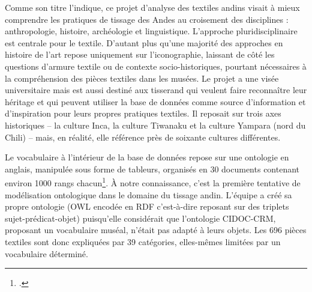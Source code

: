Comme son titre l'indique, ce projet d'analyse des textiles andins visait à mieux comprendre les pratiques de tissage des Andes au croisement des disciplines : anthropologie, histoire, archéologie et linguistique. L'approche pluridisciplinaire est centrale pour le textile. D'autant plus qu'une majorité des approches en histoire de l'art repose uniquement sur l'iconographie, laissant de côté les questions d'armure textile ou de contexte socio-historiques, pourtant nécessaires à la compréhension des pièces textiles dans les musées. Le projet a une visée universitaire mais est aussi destiné aux tisserand qui veulent faire reconnaître leur héritage et qui peuvent utiliser la base de données comme source d'information et d'inspiration pour leurs propres pratiques textiles. Il reposait sur trois axes historiques -- la culture Inca, la culture Tiwanaku et la culture Yampara (nord du Chili) -- mais, en réalité, elle référence près de soixante cultures différentes.

Le vocabulaire à l'intérieur de la base de données repose sur une ontologie en anglais, manipulée sous forme de tableurs, organisés en 30 documents contenant environ 1000 rangs chacun\footcite[p.~7]{brownlowOntologicalApproachCreating2015}. À notre connaissance, c'est la première tentative de modélisation ontologique dans le domaine du tissage andin. L'équipe a créé sa propre ontologie (OWL encodée en RDF c'est-à-dire reposant sur des triplets sujet-prédicat-objet) puisqu'elle considérait que l'ontologie CIDOC-CRM, proposant un vocabulaire muséal, n'était pas adapté à leurs objets. Les 696 pièces textiles sont donc expliquées par 39 catégories, elles-mêmes limitées par un vocabulaire déterminé.

